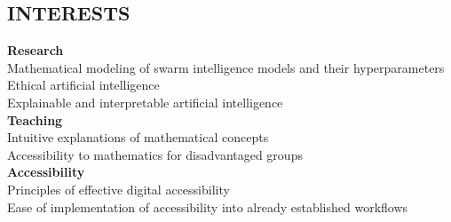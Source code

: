 \documentclass[margin]{res}
\begin{document}
\begin{resume}
\section{\uppercase{Interests}}
\textbf{Research}\\
	\hspace{3ex} Mathematical modeling of swarm intelligence models and their hyperparameters\\
	\hspace{3ex} Ethical artificial intelligence\\
	\hspace{3ex} Explainable and interpretable artificial intelligence\\
\textbf{Teaching}\\
	\hspace{3ex} Intuitive explanations of mathematical concepts\\
	\hspace{3ex} Accessibility to mathematics for disadvantaged groups\\
\textbf{Accessibility}\\
	\hspace{3ex} Principles of effective digital accessibility\\
	\hspace{3ex} Ease of implementation of accessibility into already established workflows\\



\end{resume}
\end{document}

